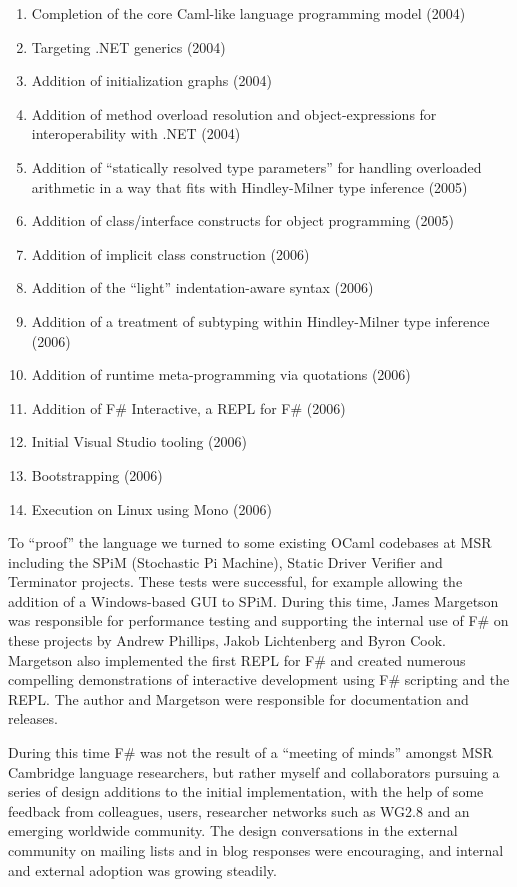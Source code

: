 \documentclass[acmsmall,review]{acmart}\settopmatter{printfolios=true,printccs=false,printacmref=false}
\begin{document}
\begin{enumerate}
\item Completion of the core Caml-like language programming model (2004)
\item Targeting .NET generics (2004)
\item Addition of initialization graphs (2004)
\item Addition of method overload resolution and object-expressions for interoperability with .NET (2004)
\item Addition of “statically resolved type parameters” for handling overloaded arithmetic in a way that fits with Hindley-Milner type inference (2005)
\item Addition of class/interface constructs for object programming (2005)
\item Addition of implicit class construction (2006)
\item Addition of the “light” indentation-aware syntax (2006)
\item Addition of a treatment of subtyping within Hindley-Milner type inference (2006)
\item Addition of runtime meta-programming via quotations (2006)
\item Addition of F\# Interactive, a REPL for F\# (2006)
\item Initial Visual Studio tooling (2006)
\item Bootstrapping (2006)
\item Execution on Linux using Mono (2006)
\end{enumerate}

To “proof” the language we turned to some existing OCaml codebases at MSR including the SPiM (Stochastic Pi Machine), Static Driver Verifier and Terminator projects.  These tests were successful, for example allowing the addition of a Windows-based GUI to SPiM.   During this time, James Margetson was responsible for performance testing and supporting the internal use of F\# on these projects by Andrew Phillips, Jakob Lichtenberg and Byron Cook. Margetson also implemented the first REPL for F\# and created numerous compelling demonstrations of interactive development using F\# scripting and the REPL. The author and Margetson were responsible for documentation and releases.

During this time F\# was not the result of a “meeting of minds” amongst MSR Cambridge language researchers, but rather myself and collaborators pursuing a series of design additions to the initial implementation, with the help of some feedback from colleagues, users, researcher networks such as WG2.8 and an emerging worldwide community.  The design conversations in the external community on mailing lists and in blog responses were encouraging, and internal and external adoption was growing steadily. 
\end{document}
